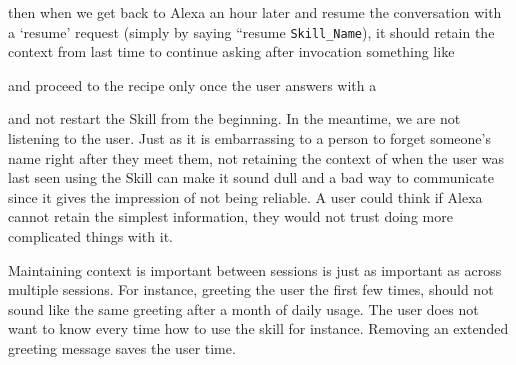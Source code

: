 

\noindent then when we get back to Alexa an hour later and resume the conversation with a `resume' request (simply by saying ``resume \texttt{Skill_Name}), it should retain the context from last time to continue asking after invocation something like



\begin{flushright}
\end{flushright}

\noindent and proceed to the recipe only once the user answers with a 





\noindent and not restart the Skill from the beginning. In the meantime, we are not listening to the user. Just as it is embarrassing to a person to forget someone's name right after they meet them, not retaining the context of when the user was last seen using the Skill can make it sound dull and a bad way to communicate since it gives the impression of not being reliable. A user could think if Alexa cannot retain the simplest information, they would not trust doing more complicated things with it.

Maintaining context is important between sessions is just as important as across multiple sessions. For instance, greeting the user the first few times, should not sound like the same greeting after a month of daily usage. The user does not want to know every time how to use the skill for instance. Removing an extended greeting message saves the user time.

